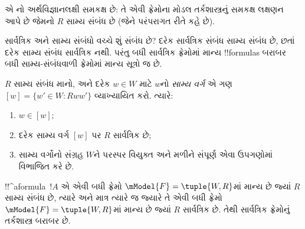 \documentclass[../../../include/open-logic-section]{subfiles}
\begin{document}
 એ નો
અર્થવિજ્ઞાનલક્ષી સમકક્ષ છે: તે એવી ફ્રેમોના મોડલ
તર્કશાસ્ત્રનું સમકક્ષ લક્ષણન આપે છે જેમનો $R$
સામ્ય સંબંધ છે (જેને પરંપરાગત રીતે  કહે છે).

સાર્વત્રિક અને સામ્ય સંબંધો વચ્ચે શું સંબંધ છે?
દરેક સાર્વત્રિક સંબંધ સામ્ય સંબંધ છે, છતાં દરેક
સામ્ય સંબંધ સાર્વત્રિક નથી. પરંતુ બધી સાર્વત્રિક
ફ્રેમોમાં માન્ય !!{formula}s બરાબર બધી સામ્ય-સંબંધવાળી
ફ્રેમોમાં માન્ય સૂત્રો જ છે.

\begin{prop}
  $R$ સામ્ય સંબંધ માનો, અને દરેક $w \in W$ માટે
  $w$નો \emph{સામ્ય વર્ગ} એ ગણ $[w] = \{w'\in W :
  Rww'\}$ વ્યાખ્યાયિત કરો. ત્યારે:
  \begin{enumerate}
  \item $w \in [w]$;
  \item દરેક સામ્ય વર્ગ $[w]$ પર $R$ સાર્વત્રિક છે;
  \item સામ્ય વર્ગોનો સંગ્રહ $W$ને પરસ્પર વિયુક્ત
    અને મળીને સંપૂર્ણ એવા ઉપગણોમાં વિભાજિત કરે છે.
  \end{enumerate}
\end{prop}

\begin{prop}
  !!^a{formula}~$!A$ એ એવી બધી ફ્રેમો
  $\mModel{F} =\tuple{W,R}$માં માન્ય છે જ્યાં $R$
  સામ્ય સંબંધ છે, ત્યારે અને માત્ર ત્યારે જ જ્યારે
  તે એવી બધી ફ્રેમો $\mModel{F} =\tuple{W,R}$માં
  માન્ય છે જ્યાં $R$ સાર્વત્રિક છે. તેથી સાર્વત્રિક
  ફ્રેમોનું તર્કશાસ્ત્ર બરાબર  છે.
\end{prop}
\end{document}
